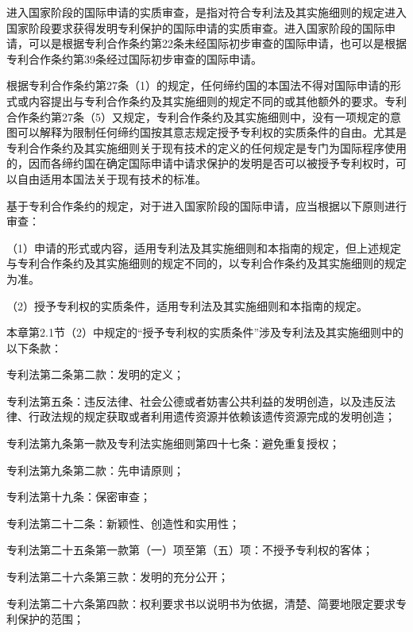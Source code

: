 进入国家阶段的国际申请的实质审查，是指对符合专利法及其实施细则的规定进入国家阶段要求获得发明专利保护的国际申请的实质审查。进入国家阶段的国际申请，可以是根据专利合作条约第22条未经国际初步审查的国际申请，也可以是根据专利合作条约第39条经过国际初步审查的国际申请。

根据专利合作条约第27条（1）的规定，任何缔约国的本国法不得对国际申请的形式或内容提出与专利合作条约及其实施细则的规定不同的或其他额外的要求。专利合作条约第27条（5）又规定，专利合作条约及其实施细则中，没有一项规定的意图可以解释为限制任何缔约国按其意志规定授予专利权的实质条件的自由。尤其是专利合作条约及其实施细则关于现有技术的定义的任何规定是专门为国际程序使用的，因而各缔约国在确定国际申请中请求保护的发明是否可以被授予专利权时，可以自由适用本国法关于现有技术的标准。

基于专利合作条约的规定，对于进入国家阶段的国际申请，应当根据以下原则进行审查：

{\setlength{\parindent}{17.1bp}（1）申请的形式或内容，适用专利法及其实施细则和本指南的规定，但上述规定与专利合作条约及其实施细则的规定不同的，以专利合作条约及其实施细则的规定为准。\par}

{\setlength{\parindent}{17.1bp}（2）授予专利权的实质条件，适用专利法及其实施细则和本指南的规定。\par}

本章第2.1节（2）中规定的“授予专利权的实质条件”涉及专利法及其实施细则中的以下条款：

专利法第二条第二款：发明的定义；

专利法第五条：违反法律、社会公德或者妨害公共利益的发明创造，以及违反法律、行政法规的规定获取或者利用遗传资源并依赖该遗传资源完成的发明创造；

专利法第九条第一款及专利法实施细则第四十七条：避免重复授权；

专利法第九条第二款：先申请原则；

专利法第十九条：保密审查；

专利法第二十二条：新颖性、创造性和实用性；

专利法第二十五条第一款第（一）项至第（五）项：不授予专利权的客体；

专利法第二十六条第三款：发明的充分公开；

专利法第二十六条第四款：权利要求书以说明书为依据，清楚、简要地限定要求专利保护的范围；

